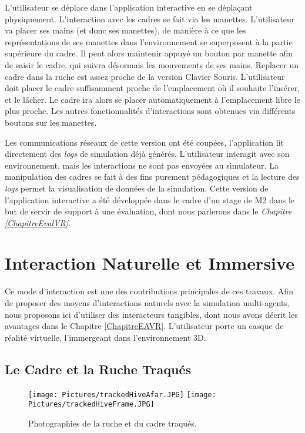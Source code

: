 		 L'utilisateur se déplace dans l'application interactive en se déplaçant physiquement. L'interaction avec les cadres se fait via les manettes. L'utilisateur va placer ses mains (et donc ses manettes), de manière à ce que les représentations de ses manettes dans l'environnement se superposent à la partie supérieure du cadre. Il peut alors maintenir appuyé un bouton par manette afin de saisir le cadre, qui suivra désormais les mouvements de ses mains. Replacer un cadre dans la ruche est assez proche de la version Clavier Souris. L'utilisateur doit placer le cadre suffisamment proche de l'emplacement où il souhaite l'insérer, et le lâcher. Le cadre ira alors se placer automatiquement à l'emplacement libre le plus proche. Les autres fonctionnalités d'interactions sont obtenues via différents boutons sur les manettes.
		
		Les communications réseaux de cette version ont été coupées, l'application lit directement des \textit{logs} de simulation déjà générés. L'utilisateur interagit avec son environnement, mais les interactions ne sont pas envoyées au simulateur. La manipulation des cadres se fait à des fins purement pédagogiques et la lecture des \textit{logs} permet la visualisation de données de la simulation. Cette version de l'application interactive a été développée dans le cadre d'un stage de M2 dans le but de servir de support à une évaluation, dont nous parlerons dans le \textit{Chapitre \ref{ChapitreEvalVR}}.
		
		
	\section{Interaction Naturelle et Immersive}
	\label{InterTangible}
	
	Ce mode d'interaction est une des contributions principales de ces travaux. Afin de proposer des moyens d'interactions naturels avec la simulation multi-agents, nous proposons ici d'utiliser des interacteurs tangibles, dont nous avons décrit les avantages dans le Chapitre \ref{ChapitreEAVR}. L'utilisateur porte un casque de réalité virtuelle, l'immergeant dans l'environnement 3D.

		\subsection{Le Cadre et la Ruche Traqués}		
		
		\begin{figure}
		\centering
		\texttt{[image: Pictures/trackedHiveAfar.JPG]}
		\texttt{[image: Pictures/trackedHiveFrame.JPG]}
		\caption{Photographies de la ruche et du cadre traqués.}
		\label{photoTracked}
		\end{figure}	
		
